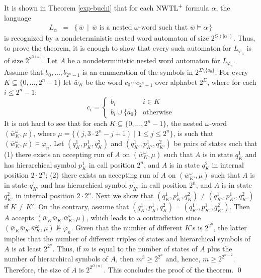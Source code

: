 \documentclass{LMCS}
\newcommand{\M}{{\mu}}
\newcommand{\w}{{\bar{w}}}
\renewcommand{\phi}{\varphi}
\theoremstyle{plain}
\theoremstyle{definition}
\newcommand{\nwtlp}{\nwtl^+}
\begin{document}
It is shown in Theorem \ref{exp-buchi} that for each $\nwtlp$
formula $\alpha$, the language 
\begin{eqnarray*}
L_\alpha & = & \{\,\w \,\mid\, \w \text{ is a nested $\omega$-word
such that $\w \models \alpha$}\,\} 
\end{eqnarray*}
is recognized by a nondeterministic nested word automaton of size
$2^{O(|\alpha|)}$. Thus, to prove the theorem, it is enough to show
that every such automaton for $L_{\varphi_n}$ is of size
$2^{2^{\Omega(n)}}$.  Let $A$ be a nondeterministic nested word
automaton for $L_{\varphi_n}$.  Assume that $b_0,\dots,b_{2^n-1}$ is
an enumeration of the symbols in $2^{\Sigma \setminus
\{a_0\}}$. For every $K \subseteq
\{0,\dots,2^n-1\}$ let $\w_K$ be the word $c_0 \cdots c_{2^n-1}$ over
alphabet $2^\Sigma$, where for each $i \leq 2^n-1$:
\begin{equation*}
c_i = 
\begin{cases}
b_i & i \in K\\
b_i \cup \{a_0\} & \text{otherwise}
\end{cases}
\end{equation*}
It is not hard to see that for each $K \subseteq \{0,\dots,2^n-1\}$,
the nested $\omega$-word $(\w_K^\omega,\M)$, where $\M = \{(j, 3 \cdot
2^n - j + 1) \mid 1 \leq j \leq 2^{n}\}$, is such that
$(\w_K^\omega,\M) \models \phi_n$. Let $(q^1_K,p^1_K,q^2_K)$ and
$(q^1_{K'},p^1_{K'},q^2_{K'})$ be pairs of states such that (1) there
exists an accepting run of $A$ on $(\w_K^\omega,\M)$ such that $A$ is
in state $q^1_K$ and has hierarchical symbol $p^1_K$ in call position
$2^n$, and $A$ is in state $q^2_K$ in internal position $2 \cdot 2^n$;
(2) there exists an accepting run of $A$ on $(\w_{K'}^\omega,\M)$ such
that $A$ is in state $q^1_{K'}$ and has hierarchical symbol $p^1_{K'}$
in call position $2^n$, and $A$ is in state $q^2_{K'}$ in internal
position $2 \cdot 2^n$. Next we show that $(q^1_K,p^1_K,q^2_K) \neq
(q^1_{K'},p^1_{K'},q^2_{K'})$ if $K \neq K'$. On the contrary, assume
that $(q^1_K,p^1_K,q^2_K) = (q^1_{K'},p^1_{K'},q^2_{K'})$. Then $A$ accepts
$(\w_K \w_{K'} \w_K^\omega,\M)$, which leads to a contradiction since $(\w_K
\w_{K'} \w_K^\omega,\M) \not\models \varphi_n$. Given that the number
of different $K$'s is $2^{2^n}$, the latter implies that the number of
different triples of states and hierarchical symbols of $A$ is at
least $2^{2^n}$. Thus, if $m$ is equal to the number of states of $A$
plus the number of hierarchical symbols of $A$, then $m^3 \geq
2^{2^n}$ and, hence, $m \geq 2^{2^{n-2}}$. Therefore, the size of $A$
is $2^{2^{\Omega(n)}}$. This concludes the proof of the theorem.
\qed
\end{document}
